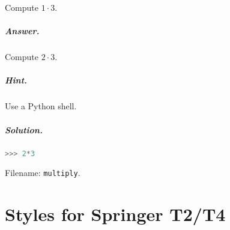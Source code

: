 \documentclass[graybox,sectrefs,envcountresetchap,open=right,final]{svmonodo}
\makeatletter
\newenvironment{doconceexercise}{}{}
\newcounter{doconceexercisecounter}%
\newcommand\listofexercises{
\chapter*{List of Problems
          \@mkboth{List of Problems}{List of Problems}}
\markboth{List of Problems}{List of Problems}
\@starttoc{loe}
}
\makeatother
\begin{document}
\begin{doconceexercise}

                
\label{exer:mul}

Compute $1\cdot 3$.

\paragraph{Answer.}



Compute $2\cdot 3$.


\paragraph{Hint.}
Use a Python shell.


\paragraph{Solution.}



\begin{lstlisting}[language=Python,style=simple,xleftmargin=2mm]
>>> 2*3


\end{lstlisting}



\noindent Filename: \texttt{multiply}.

\end{doconceexercise}



\appendix

\chapter{Styles for Springer T2/T4}
\end{document}
